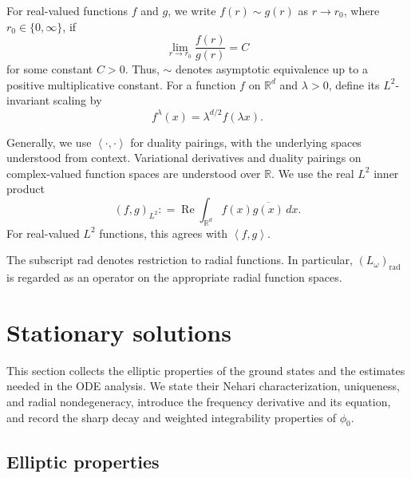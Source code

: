 \documentclass[12pt, a4paper, reqno]{amsart}
\numberwithin{equation}{section}
\theoremstyle{definition}
\theoremstyle{remark}
\newcommand{\R}{\mathbb R}
\renewcommand{\Re}{\operatorname{Re}}
\def\tbra[#1,#2]{{\left\langle #1,#2\right\rangle}}
\def\rbra[#1,#2]{{\left( #1,#2\right)}}
\newcommand{\rad}{\mathrm{rad}}
\newcommand{\ce}{\mathrel{\mathop:}=}
\begin{document}
For real-valued functions $f$ and $g$, we write $f(r)\sim g(r)$
as $r\to r_0$, where $r_0\in\{0,\infty\}$, if
\[
  \lim_{r\to r_0}\frac{f(r)}{g(r)} =C
\]
for some constant $C>0$. Thus, $\sim$ denotes asymptotic equivalence
up to a positive multiplicative constant. For a function $f$ on $\R^d$ and $\lambda>0$, define its
$L^2$-invariant scaling by
\[
  f^\lambda(x)=\lambda^{d/2}f(\lambda x).
\]

Generally, we use $\tbra[\cdot,\cdot]$ for duality pairings,
with the underlying spaces understood from context. Variational derivatives
and duality pairings on complex-valued function spaces are understood over
$\R$. We use the real $L^2$ inner product
\[
  \rbra[f,g]_{L^2}\ce\Re\int_{\R^d}f(x)\overline{g(x)}\,dx.
\]
For real-valued $L^2$ functions, this agrees with $\tbra[f,g]$.

The subscript $\rad$ denotes restriction to radial functions. In particular, $(L_\omega)_{\rad}$ is regarded as an operator on the appropriate radial function spaces. 



\section{Stationary solutions}\label{sec:ellip}

This section collects the elliptic properties of the ground states
and the estimates needed in the ODE analysis. We state their Nehari
characterization, uniqueness, and radial nondegeneracy, introduce the
frequency derivative and its equation, and record the sharp decay and
weighted integrability properties of $\phi_0$. 

\subsection{Elliptic properties}
\label{sec:2.1}
\end{document}
